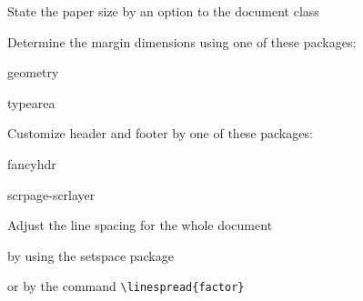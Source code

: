 \documentclass{article}
\begin{document}
\begin{compactenum}
  \item State the paper size by an option to
        the document class
  \item Determine the margin dimensions using one
        of these packages:
  \begin{compactitem}
    \item geometry
    \item typearea
  \end{compactitem}
  \item Customize header and footer by one
        of these packages:
  \begin{compactitem}
    \item fancyhdr
    \item scrpage-scrlayer
  \end{compactitem}
  \item Adjust the line spacing for the whole document
  \begin{compactitem}
    \item by using the setspace package
    \item or by the command \verb|\linespread{factor}|
  \end{compactitem}
\end{compactenum}
\end{document}
